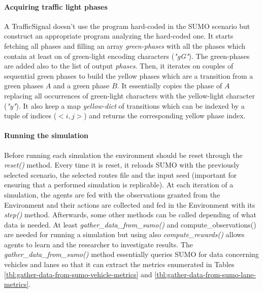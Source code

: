 \paragraph{Acquiring traffic light phases}

A TrafficSignal doesn't use the program hard-coded in the SUMO scenario but construct an appropriate program analyzing the hard-coded one.
It starts fetching all phases and filling an array \textit{green-phases} with all the phases which contain at least on of green-light encoding characters (\textit{"gG"}).
The green-phases are added also to the list of output \textit{phases}.
Then, it iterates on couples of sequential green phases to build the yellow phases which are a transition from a green phases $A$ and a green phase $B$. It essentially copies the phase of $A$ replacing all occurrences of green-light characters with the yellow-light character (\textit{"y"}).
It also keep a map \textit{yellow-dict} of transitions which can be indexed by a tuple of indices ($<i, j>$) and returns the corresponding yellow phase index.

\paragraph{Running the simulation}

Before running each simulation the environment should be reset through the \textit{reset()} method.
Every time it is reset, it reloads SUMO with the previously selected scenario, the selected routes file and the input seed (important for ensuring that a performed simulation is replicable).
At each iteration of a simulation, the agents are fed with the observations granted from the Environment and their actions are collected and fed in the Environment with its \textit{step()} method.
Afterwards, some other methods can be called depending of what data is needed. At least \textit{gather\_data\_from\_sumo()} and {compute\_observations()} are needed for running a simulation but using also \textit{compute\_rewards()} allows agents to learn and the researcher to investigate results. The \textit{gather\_data\_from\_sumo()} method essentially queries SUMO for data concerning vehicles and lanes so that it can extract the metrics enumerated in Tables \ref{tbl:gather-data-from-sumo-vehicle-metrics} and \ref{tbl:gather-data-from-sumo-lane-metrics}.

\begin{table}[H]
  \label{tbl:gather-data-from-sumo-vehicle-metrics}
\end{table}

